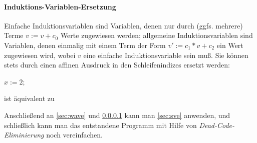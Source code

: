 \paragraph{Induktions-Variablen-Ersetzung}
\label{sec:ive}

Einfache Induktionsvariablen sind Variablen, denen nur durch (ggfs.
mehrere) Terme $v := v + c_0$ Werte zugewiesen werden; allgemeine
Induktionsvariablen sind Variablen, denen einmalig mit einem Term der
Form $v':= c_1*v + c_2$ ein Wert zugewiesen wird, wobei $v$ eine
einfache Induktionsvariable sein muß.  Sie können stets durch einen
affinen Ausdruck in den Schleifenindizes
ersetzt werden:\\

\begin{minipage}[c]{4cm}
    \begin{algorithm}[H]
        \( x:= 2 \);\\
    \end{algorithm}
\end{minipage}
%
\begin{minipage}[c]{4cm}
\centerline{ist äquivalent zu}
\end{minipage}
%
\begin{minipage}[c]{4cm}
    \begin{algorithm}[H]
    \end{algorithm}
\end{minipage}

\bigskip
Anschließend an \ref{sec:wave} und \ref{sec:ive} kann man \ref{sec:sve}
anwenden, und schließlich kann man das entstandene Programm mit Hilfe von
\emph{Dead-Code-Eliminierung} noch vereinfachen.

